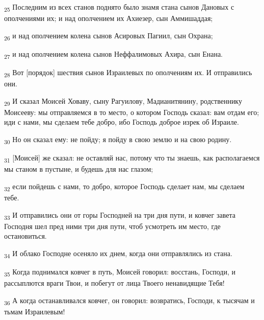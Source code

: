 \begin{tcolorbox}
\textsubscript{25} Последним из всех станов поднято было знамя стана сынов Дановых с ополчениями их; и над ополчением их Ахиезер, сын Аммишаддая;
\end{tcolorbox}
\begin{tcolorbox}
\textsubscript{26} и над ополчением колена сынов Асировых Пагиил, сын Охрана;
\end{tcolorbox}
\begin{tcolorbox}
\textsubscript{27} и над ополчением колена сынов Неффалимовых Ахира, сын Енана.
\end{tcolorbox}
\begin{tcolorbox}
\textsubscript{28} Вот [порядок] шествия сынов Израилевых по ополчениям их. И отправились они.
\end{tcolorbox}
\begin{tcolorbox}
\textsubscript{29} И сказал Моисей Ховаву, сыну Рагуилову, Мадианитянину, родственнику Моисееву: мы отправляемся в то место, о котором Господь сказал: вам отдам его; иди с нами, мы сделаем тебе добро, ибо Господь доброе изрек об Израиле.
\end{tcolorbox}
\begin{tcolorbox}
\textsubscript{30} Но он сказал ему: не пойду; я пойду в свою землю и на свою родину.
\end{tcolorbox}
\begin{tcolorbox}
\textsubscript{31} [Моисей] же сказал: не оставляй нас, потому что ты знаешь, как располагаемся мы станом в пустыне, и будешь для нас глазом;
\end{tcolorbox}
\begin{tcolorbox}
\textsubscript{32} если пойдешь с нами, то добро, которое Господь сделает нам, мы сделаем тебе.
\end{tcolorbox}
\begin{tcolorbox}
\textsubscript{33} И отправились они от горы Господней на три дня пути, и ковчег завета Господня шел пред ними три дня пути, чтоб усмотреть им место, где остановиться.
\end{tcolorbox}
\begin{tcolorbox}
\textsubscript{34} И облако Господне осеняло их днем, когда они отправлялись из стана.
\end{tcolorbox}
\begin{tcolorbox}
\textsubscript{35} Когда поднимался ковчег в путь, Моисей говорил: восстань, Господи, и рассыплются враги Твои, и побегут от лица Твоего ненавидящие Тебя!
\end{tcolorbox}
\begin{tcolorbox}
\textsubscript{36} А когда останавливался ковчег, он говорил: возвратись, Господи, к тысячам и тьмам Израилевым!
\end{tcolorbox}
